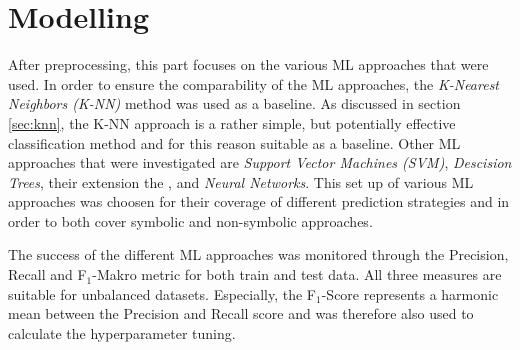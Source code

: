 \chapter{Modelling}\label{sec:data_mining}





After preprocessing, this part focuses on the various ML approaches that were used. In order to ensure the comparability of the ML approaches, the \textit{K-Nearest Neighbors (K-NN)} method was used as a baseline. As discussed in section \ref{sec:knn}, the K-NN approach is a rather simple, but potentially effective classification method and for this reason suitable as a baseline. Other ML approaches that were investigated are \textit{Support Vector Machines (SVM)}, \textit{Descision Trees}, their extension the , and \textit{Neural Networks}. This set up of various ML approaches was choosen for their coverage of different prediction strategies and in order to both cover symbolic and non-symbolic approaches.

The success of the different ML approaches was monitored through the Precision, Recall and F$_1$-Makro metric for both train and test data. All three measures are suitable for unbalanced datasets. \citep{Brownlee2020} Especially, the F$_1$-Score represents a harmonic mean between the Precision and Recall score and was therefore also used to calculate the hyperparameter tuning.\citep{Peltarion2021}


